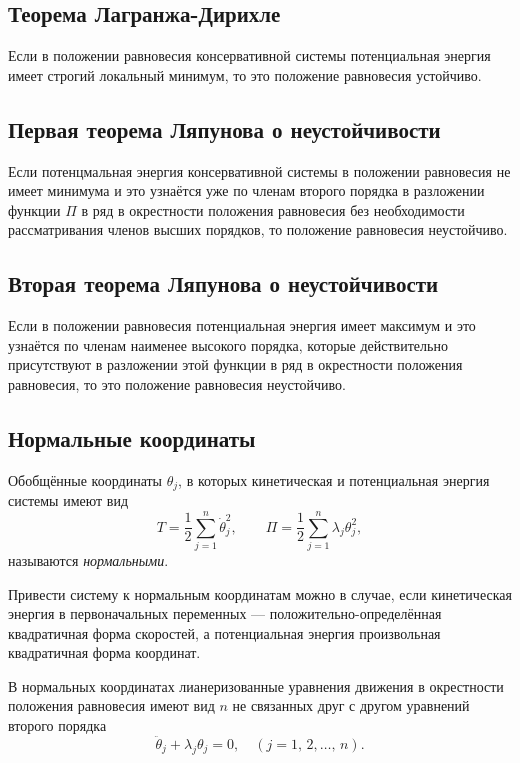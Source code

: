 \documentclass[a4paper]{article}
\begin{document}
\subsection{Теорема Лагранжа-Дирихле}
\begin{thm}
	Если в положении равновесия консервативной системы потенциальная 
	энергия имеет строгий  локальный минимум,  то это положение равновесия
	устойчиво.
\end{thm}
\subsection{Первая теорема Ляпунова о неустойчивости}
\begin{thm}[Ляпунова, 1-я]
Если потенцмальная энергия консервативной системы в положении равновесия не
имеет минимума и это узнаётся уже по членам второго порядка в разложении
функции $\Pi$ в ряд в окрестности положения равновесия без необходимости
рассматривания членов высших порядков, то положение равновесия неустойчиво.
\end{thm}
\subsection{Вторая теорема Ляпунова о неустойчивости}
\begin{thm}[Ляпунова, 2-я]
	Если в положении равновесия потенциальная энергия имеет максимум и
	это узнаётся по членам наименее высокого порядка, которые действительно
	присутствуют в разложении этой функции в ряд в окрестности положения
	равновесия, то это положение равновесия неустойчиво.
\end{thm}
\subsection{Нормальные координаты}
\begin{dfn}
	Обобщённые координаты $\theta_j$, в которых кинетическая и потенциальная
	энергия системы имеют вид
	\[
		T=\frac{1}{2} \sum_{j=1}^{n} \dot{\theta}_j^2, \qquad
		\Pi=\frac{1}{2} \sum_{j=1}^{n} \lambda_j \theta_j^2,
	\]
	называются \emph{нормальными}.
\end{dfn}
Привести систему
к нормальным координатам можно в случае, если кинетическая
энергия в первоначальных переменных --- положительно-определённая квадратичная
форма скоростей, а потенциальная энергия произвольная квадратичная форма
координат.

В нормальных координатах лианеризованные уравнения движения в окрестности
положения равновесия имеют вид $n$ не связанных друг с другом уравнений
второго порядка
\[
	\ddot{\theta}_j+\lambda_j \theta_j =0, \quad (j =1,\,2,\ldots,\,n)
.\] 
\end{document}
